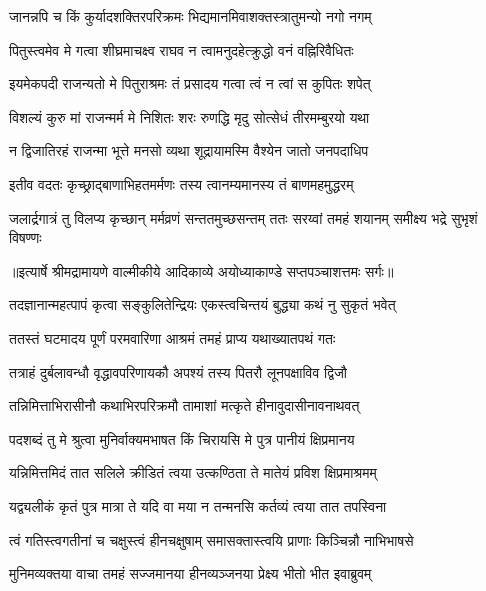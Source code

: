 \twolineshloka
{जानन्नपि च किं कुर्यादशक्तिरपरिक्रमः}
{भिद्यमानमिवाशक्तस्त्रातुमन्यो नगो नगम्} %

\twolineshloka
{पितुस्त्वमेव मे गत्वा शीघ्रमाचक्ष्व राघव}
{न त्वामनुदहेत्क्रुद्धो वनं वह्निरिवैधितः} %

\twolineshloka
{इयमेकपदी राजन्यतो मे पितुराश्रमः}
{तं प्रसादय गत्वा त्वं न त्वां स कुपितः शपेत्} %

\twolineshloka
{विशल्यं कुरु मां राजन्मर्म मे निशितः शरः}
{रुणद्धि मृदु सोत्सेधं तीरमम्बुरयो यथा} %

\twolineshloka
{न द्विजातिरहं राजन्मा भूत्ते मनसो व्यथा}
{शूद्रायामस्मि वैश्येन जातो जनपदाधिप} %

\twolineshloka
{इतीव वदतः कृच्छ्राद्बाणाभिहतमर्मणः}
{तस्य त्वानम्यमानस्य तं बाणमहमुद्धरम्} %

\fourlineindentedshloka
{जलार्द्रगात्रं तु विलप्य कृच्छान्}
{मर्मव्रणं सन्ततमुच्छसन्तम्}
{ततः सरय्वां तमहं शयानम्}
{समीक्ष्य भद्रे सुभृशं विषण्णः} %


{॥इत्यार्षे श्रीमद्रामायणे वाल्मीकीये आदिकाव्ये अयोध्याकाण्डे सप्तपञ्चाशत्तमः सर्गः॥}


\twolineshloka
{तदज्ञानान्महत्पापं कृत्वा सङ्कुलितेन्द्रियः}
{एकस्त्वचिन्तयं बुद्ध्या कथं नु सुकृतं भवेत्} %

\twolineshloka
{ततस्तं घटमादय पूर्णं परमवारिणा}
{आश्रमं तमहं प्राप्य यथाख्यातपथं गतः} %

\twolineshloka
{तत्राहं दुर्बलावन्धौ वृद्धावपरिणायकौ}
{अपश्यं तस्य पितरौ लूनपक्षाविव द्विजौ} %

\twolineshloka
{तन्निमित्ताभिरासीनौ कथाभिरपरिक्रमौ}
{तामाशां मत्कृते हीनावुदासीनावनाथवत्} %

\twolineshloka
{पदशब्दं तु मे श्रुत्वा मुनिर्वाक्यमभाषत}
{किं चिरायसि मे पुत्र पानीयं क्षिप्रमानय} %

\twolineshloka
{यन्निमित्तमिदं तात सलिले क्रीडितं त्वया}
{उत्कण्ठिता ते मातेयं प्रविश क्षिप्रमाश्रमम्} %

\twolineshloka
{यद्व्यलीकं कृतं पुत्र मात्रा ते यदि वा मया}
{न तन्मनसि कर्तव्यं त्वया तात तपस्विना} %

\twolineshloka
{त्वं गतिस्त्वगतीनां च चक्षुस्त्वं हीनचक्षुषाम्}
{समासक्तास्त्वयि प्राणाः किञ्चिन्नौ नाभिभाषसे} %

\twolineshloka
{मुनिमव्यक्तया वाचा तमहं सज्जमानया}
{हीनव्यञ्जनया प्रेक्ष्य भीतो भीत इवाब्रुवम्} %

